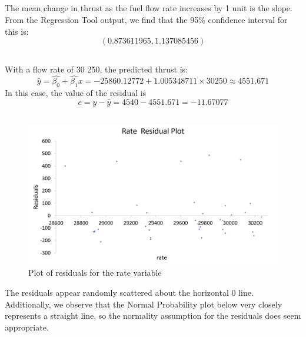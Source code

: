 \documentclass[letterpaper]{article}
\begin{document}
\subsection{}
The mean change in thrust as the fuel flow rate increases by 1 unit is the slope.
From the Regression Tool output, we find that the 95\% confidence interval
for this is:
$$(0.873611965, 1.137085456)$$

\subsection{}

With a flow rate of 30 250, the predicted thrust is:
$$\hat{y} = \hat{\beta_0} + \hat{\beta_1}x = -25860.12772 + 1.005348711 \times 30250 \approx 4551.671 $$
In this case, the value of the residual is
$$e = y-\hat{y} = 4540 - 4551.671 = -11.67077$$

\subsection{}

\begin{figure}[H]
 \centering
 \includegraphics[width=\textwidth]{rateresidual.png}
 \caption{Plot of residuals for the rate variable}
\end{figure}
The residuals appear randomly scattered about the horizontal 0 line.
Additionally, we observe that the Normal Probability plot below
very closely represents a straight line, so the normality assumption for the
residuals does seem appropriate.
\end{document}
